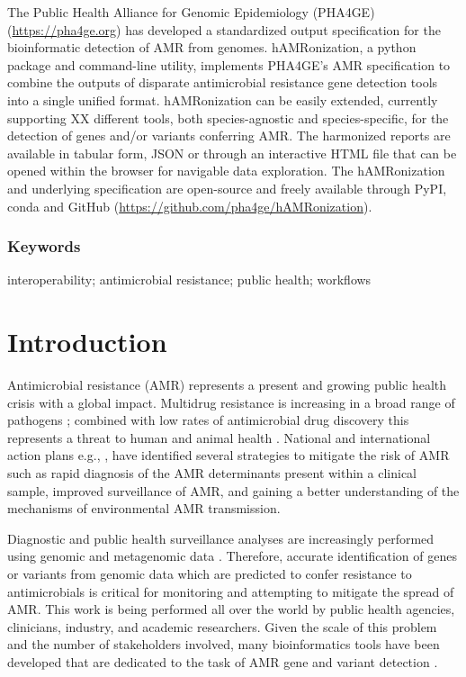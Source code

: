 The Public Health Alliance for Genomic Epidemiology (PHA4GE) (\url{https://pha4ge.org}) has developed a standardized output specification for the bioinformatic detection of AMR from genomes. hAMRonization, a python package and command-line utility, implements PHA4GE’s AMR specification to combine the outputs of disparate antimicrobial resistance gene detection tools into a single unified format.  hAMRonization can be easily extended, currently supporting XX different  tools, both species-agnostic and species-specific, for the detection of genes and/or variants conferring AMR. The harmonized reports are available in tabular form, JSON or through an interactive HTML file that can be opened within the browser for navigable data exploration. The hAMRonization and underlying specification are open-source and freely available through PyPI, conda and GitHub (\url{https://github.com/pha4ge/hAMRonization}).

\subsubsection{Keywords}

interoperability; antimicrobial resistance; public health; workflows

\section{Introduction}

Antimicrobial resistance (AMR) represents a present and growing public health crisis with a global impact.  Multidrug resistance is increasing in a broad range of pathogens \cite{aslam_antibiotic_2018}; combined with low rates of antimicrobial drug discovery \cite{brown_antibacterial_2016} this represents a threat to human and animal health \cite{who_who_2015}. National and international action plans e.g., \cite{jim_oneill_antimicrobial_2014, jim_oneill_tackling_2016, public_health_agency_of_canada_antimicrobial_2014, who_who_2015}, have identified several strategies to mitigate the risk of AMR such as rapid diagnosis of the AMR determinants present within a clinical sample, improved surveillance of AMR, and gaining a better understanding of the mechanisms of environmental AMR transmission.

Diagnostic and public health surveillance analyses are increasingly performed using genomic and metagenomic data \cite{mcarthur_antimicrobial_2017}. Therefore, accurate identification of genes or variants from genomic data which are predicted to confer resistance to antimicrobials is critical for monitoring and attempting to mitigate the spread of AMR. This work is being performed all over the world by public health agencies, clinicians, industry, and academic researchers. Given the scale of this problem and the number of stakeholders involved, many bioinformatics tools have been developed that are dedicated to the task of AMR gene and variant detection \cite{boolchandani_sequencing-based_2019, hendriksen_using_2019, mcarthur_antimicrobial_2017}. 

